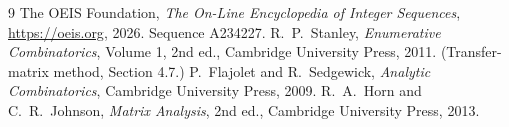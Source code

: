 \documentclass[11pt,a4paper]{article}
\theoremstyle{plain}
\theoremstyle{definition}
\begin{document}
\begin{thebibliography}{9}
 The OEIS Foundation, \emph{The On-Line Encyclopedia of Integer
Sequences}, \url{https://oeis.org}, 2026. Sequence A234227.
 R.~P.~Stanley, \emph{Enumerative Combinatorics}, Volume 1, 2nd ed.,
Cambridge University Press, 2011. (Transfer-matrix method, Section 4.7.)
 P.~Flajolet and R.~Sedgewick, \emph{Analytic Combinatorics}, Cambridge
University Press, 2009.
 R.~A.~Horn and C.~R.~Johnson, \emph{Matrix Analysis}, 2nd ed., Cambridge
University Press, 2013.
\end{thebibliography}
\end{document}

